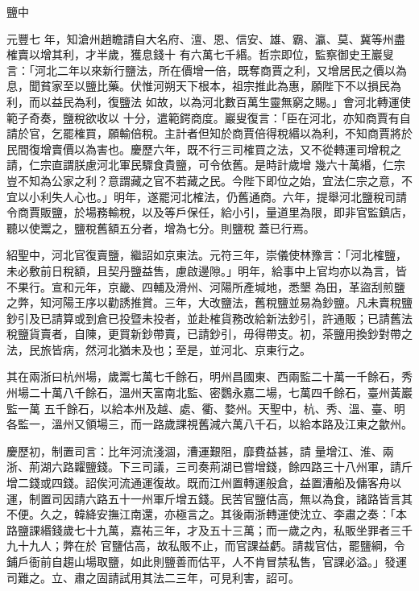 
\begin{pinyinscope}

 鹽中



 元豐七
 年，知滄州趙瞻請自大名府、澶、恩、信安、雄、霸、瀛、莫、冀等州盡榷賣以增其利，才半歲，獲息錢十
 有六萬七千緡。哲宗即位，監察御史王巖叟言：「河北二年以來新行鹽法，所在價增一倍，既奪商賈之利，又增居民之價以為息，聞貧家至以鹽比藥。伏惟河朔天下根本，祖宗推此為惠，願陛下不以損民為利，而以益民為利，復鹽法
 如故，以為河北數百萬生靈無窮之賜。」會河北轉運使範子奇奏，鹽稅欲收以
 十分，遣範鍔商度。巖叟復言：「臣在河北，亦知商賈有自請於官，乞罷榷買，願輸倍稅。主計者但知於商賈倍得稅緡以為利，不知商賈將於民間復增賣價以為害也。慶歷六年，既不行三司榷買之法，又不從轉運司增稅之請，仁宗直謂朕慮河北軍民驟食貴鹽，可令依舊。是時計歲增
 幾六十萬緡，仁宗豈不知為公家之利？意謂藏之官不若藏之民。今陛下即位之始，宜法仁宗之意，不宜以小利失人心也。」明年，遂罷河北榷法，仍舊通商。六年，提舉河北鹽稅司請令商賈販鹽，於場務輸稅，以及等戶保任，給小引，量道里為限，即非官監鎮店，聽以使鬻之，鹽稅舊額五分者，增為七分。則鹽稅
 蓋已行焉。



 紹聖中，河北官復賣鹽，繼詔如京東法。元符三年，崇儀使林豫言：「河北榷鹽，未必敷前日稅額，且契丹鹽益售，慮啟邊隙。」明年，給事中上官均亦以為言，皆不果行。宣和元年，京畿、四輔及滑州、河陽所產堿地，悉墾
 為田，革盜刮煎鹽之弊，知河陽王序以勸誘推賞。三年，大改鹽法，舊稅鹽並易為鈔鹽。凡未賣稅鹽鈔引及已請算或到倉已投暨未投者，並赴榷貨務改給新法鈔引，許通販；已請舊法稅鹽貨賣者，自陳，更買新鈔帶賣，已請鈔引，毋得帶支。初，茶鹽用換鈔對帶之法，民旅皆病，然河北猶未及也；至是，並河北、京東行之。



 其在兩浙曰杭州場，歲鬻七萬七千餘石，明州昌國東、西兩監二十萬一千餘石，秀州場二十萬八千餘石，溫州天富南北監、密鸚永嘉二場，七萬四千餘石，臺州黃巖監一萬
 五千餘石，以給本州及越、處、衢、婺州。天聖中，杭、秀、溫、臺、明各監一，溫州又領場三，而一路歲課視舊減六萬八千石，以給本路及江東之歙州。



 慶歷初，制置司言：比年河流淺涸，漕運艱阻，靡費益甚，請
 量增江、淮、兩浙、荊湖六路糶鹽錢。下三司議，三司奏荊湖已嘗增錢，餘四路三十八州軍，請斤增二錢或四錢。詔俟河流通運復故。既而江州置轉運般倉，益置漕船及傭客舟以運，制置司因請六路五十一州軍斤增五錢。民苦官鹽估高，無以為食，諸路皆言其不便。久之，韓絳安撫江南還，亦極言之。其後兩浙轉運使沈立、李肅之奏：「本路鹽課緡錢歲七十九萬，嘉祐三年，才及五十三萬；而一歲之內，私販坐罪者三千九十九人；弊在於
 官鹽估高，故私販不止，而官課益虧。請裁官估，罷鹽綱，令鋪戶衙前自趨山場取鹽，如此則鹽善而估平，人不肯冒禁私售，官課必溢。」發運司難之。立、肅之固請試用其法二三年，可見利害，詔可。




\end{pinyinscope}
